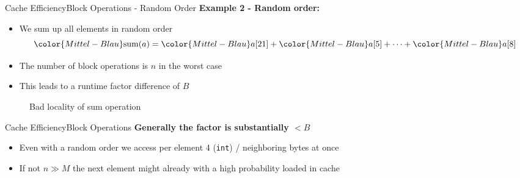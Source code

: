 \begin{frame}{Cache Efficiency}{Block Operations - Random Order}
  \textbf{Example 2 - Random order:}
  \begin{itemize}
    \item<2->
      We sum up all elements in {\color{Mittel-Blau}random order}
      \begin{displaymath}
        {\color{Mittel-Blau}\mathrm{sum}(a)} =
        {\color{Mittel-Blau}a[21]} +
        {\color{Mittel-Blau}a[5]} +
        \dots +
        {\color{Mittel-Blau}a[8]}
      \end{displaymath}
    \item<3->
      The number of block operations is {\color{Mittel-Blau}$n$} in the
      {\color{Mittel-Blau}worst case}
    \item<4->
      This leads to a runtime factor difference of {\color{Mittel-Blau}$B$}
  \end{itemize}
   \vspace{-1.0em}
  \begin{figure}%
    \begin{adjustbox}{width=\linewidth}%
    \end{adjustbox}%
    \caption{Bad locality of sum operation}
    \label{fig:caching:memory_locality_random}
  \end{figure}%
  \vspace{-1.0em}
\end{frame}


\begin{frame}{Cache Efficiency}{Block Operations}
  \textbf{Generally the factor is substantially {\color{Mittel-Blau}$< B$}}
  \begin{itemize}
    \item<2->
      Even with a {\color{Mittel-Blau}random order} we access per element 4 (\texttt{int}) /
      neighboring bytes at once
    \item<3->
      If {\color{Mittel-Blau}not $n \gg M$} the next element might already
      with a high probability loaded in cache
  \end{itemize}
\end{frame}



